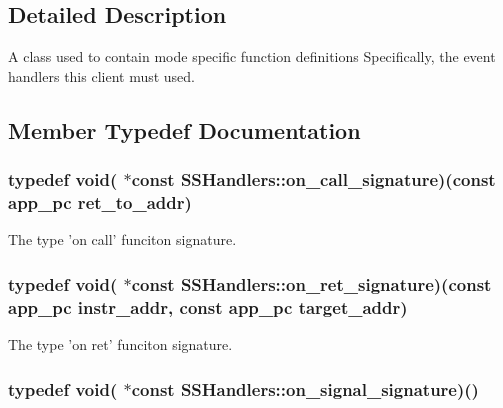 \subsection{Detailed Description}
A class used to contain mode specific function definitions Specifically, the event handlers this client must used. 

\subsection{Member Typedef Documentation}
\hypertarget{class_s_s_handlers_a7dfce2bdabde106253c02c2c012c1ea1}{
\subsubsection[{on\-\_\-call\-\_\-signature}]{\setlength{\rightskip}{0pt plus 5cm}typedef void( $\ast$const S\-S\-Handlers\-::on\-\_\-call\-\_\-signature)(const app\-\_\-pc ret\-\_\-to\-\_\-addr)\hspace{0.3cm}{\ttfamily [private]}}}\label{class_s_s_handlers_a7dfce2bdabde106253c02c2c012c1ea1}


The type 'on call' funciton signature. 

\hypertarget{class_s_s_handlers_ac88de91ef7a6133f1836e4e7413ee5a1}{
\subsubsection[{on\-\_\-ret\-\_\-signature}]{\setlength{\rightskip}{0pt plus 5cm}typedef void( $\ast$const S\-S\-Handlers\-::on\-\_\-ret\-\_\-signature)(const app\-\_\-pc instr\-\_\-addr, const app\-\_\-pc target\-\_\-addr)\hspace{0.3cm}{\ttfamily [private]}}}\label{class_s_s_handlers_ac88de91ef7a6133f1836e4e7413ee5a1}


The type 'on ret' funciton signature. 

\hypertarget{class_s_s_handlers_ad3cf1de404b14193c28b3247f6a88d73}{
\subsubsection[{on\-\_\-signal\-\_\-signature}]{\setlength{\rightskip}{0pt plus 5cm}typedef void( $\ast$const S\-S\-Handlers\-::on\-\_\-signal\-\_\-signature)()\hspace{0.3cm}{\ttfamily [private]}}}\label{class_s_s_handlers_ad3cf1de404b14193c28b3247f6a88d73}


